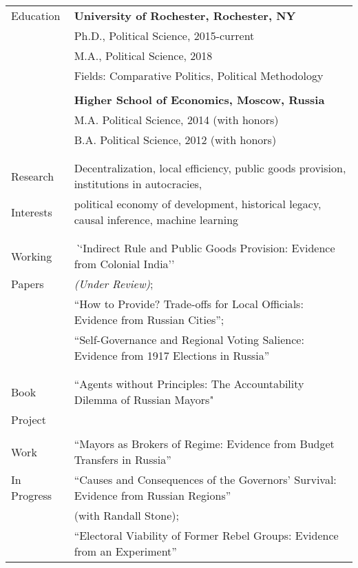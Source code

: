 \documentclass[letterpaper,11pt,oneside]{article}
\begin{document}
\noindent \begin{tabular}{@{} l l}
 \Large{Education}    & \textbf{University of Rochester, Rochester, NY} \\
     & Ph.D., Political Science, 2015-current \\
     & M.A., Political Science, 2018 \\
     & Fields: Comparative Politics, Political Methodology \\
     \vspace*{-2mm}
     & \\
     & \textbf{Higher School of Economics, Moscow, Russia} \\
     & M.A. Political Science, 2014 (with honors) \\
     & B.A. Political Science, 2012 (with honors) \\
     & \\
&\\
\Large{Research} & Decentralization, local efficiency, public goods provision,  institutions in autocracies,  \\
\Large{Interests} &political economy of development, historical legacy, causal inference, machine learning\\
 & \\
&\\
\Large{Working}
 & \textit``Indirect Rule and Public Goods Provision: Evidence from Colonial  India''\\
 \Large{Papers}& \textit{(Under Review)};\\
 & ``How to Provide? Trade-offs for Local Officials: Evidence from Russian Cities'';\\
 &   ``Self-Governance and Regional Voting Salience: Evidence from 1917 Elections in Russia''\\
  & \\
 &\\
 \Large{Book}
 & ``Agents without Principles: The Accountability Dilemma of Russian Mayors" \\
 \Large{Project} 
  & \\
 &\\
 \Large{Work}
 & ``Mayors as Brokers of Regime: Evidence from Budget Transfers in Russia''\\
  \Large{In Progress} &``Causes and Consequences of the Governors' Survival: Evidence from Russian Regions''\\
  & (with Randall Stone);\\
   & ``Electoral Viability of Former Rebel Groups: Evidence from an Experiment''\\

\end{tabular}
\end{document}

